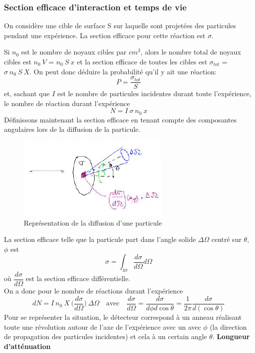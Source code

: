     \subsubsection{Section efficace d'interaction et temps de vie}
    
    On considère une cible de surface S sur laquelle sont projetées des particules pendant une expérience. La section efficace pour cette réaction est $\sigma$.
    
    \vspace{0.2cm}
    
    Si $n_0$ est le nombre de noyaux cibles par $cm^3$, alors le nombre total de noyaux cibles est $n_0~V$ = $n_0~S~x$ et la section efficace de toutes les cibles est $\sigma_{tot}$ = $\sigma~n_0~S~X$. On peut donc déduire la probabilité qu'il y ait une réaction:
        \[
            P=\dfrac{\sigma_{tot}}{S}
        \]
et, sachant que $I$ est le nombre de particules incidentes durant toute l'expérience, le nombre de réaction durant l'expérience
    \[
        N=I~\sigma~n_0~x
    \]
Définissons maintenant la section efficace en tenant compte des composantes angulaires lors de la diffusion de la particule.
    
    \begin{figure}[ht]
        \centering
        \includegraphics[scale=0.95]{Images1/secdiff.PNG}
        \caption{Représentation de la diffusion d'une particule}
    \end{figure}
La section efficace telle que la particule part dans l'angle solide $\Delta\Omega$ centré sur $\theta$, $\phi$ est
    \[
        \sigma=\int_{4\pi}^{}\dfrac{d\sigma}{d\Omega}d\Omega
    \]
où $\dfrac{d\sigma}{d\Omega}$ est la section efficace différentielle.\\[0,2cm]
On a donc pour le nombre de réactions durant l'expérience
    \[
        dN=I~n_0~X~\Big(\dfrac{d\sigma}{d\Omega}\Big)~\Delta\Omega\quad\text{avec}\quad \dfrac{d\sigma}{d\Omega}=\dfrac{d\sigma}{d\phi d\cos{\theta}}=\dfrac{1}{2\pi}\dfrac{d\sigma}{d(\cos{\theta})}
    \]
Pour se représenter la situation, le détecteur correspond à un anneau réalisant toute une révolution autour de l'axe de l'expérience avec un avec $\phi$ (la direction de propagation des particules incidentes) et cela à un certain angle $\theta$.
\textbf{Longueur d'atténuation}

